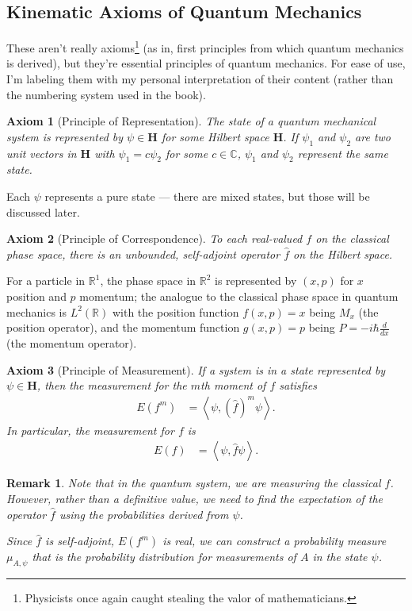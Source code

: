 \documentclass[10pt]{extarticle}
\newtheorem*{remark}{Remark}
\newcommand{\R}{\mathbb{R}}
\newcommand{\C}{\mathbb{C}}
\newcommand{\iprod}[2]{\left\langle #1,#2\right\rangle}
\theoremstyle{plain}
\newtheorem*{axiom}{Axiom}%
\theoremstyle{definition}
\theoremstyle{remark}
\renewcommand{\newline}{\hfill\break}
\begin{document}
  \subsection{Kinematic Axioms of Quantum Mechanics}%
  These aren't really axioms\footnote{Physicists once again caught stealing the valor of mathematicians.} (as in, first principles from which quantum mechanics is derived), but they're essential principles of quantum mechanics. For ease of use, I'm labeling them with my personal interpretation of their content (rather than the numbering system used in the book).
  \begin{axiom}[Principle of Representation]
    The state of a quantum mechanical system is represented by $\psi \in \mathbf{H}$ for some Hilbert space $\mathbf{H}$. If $\psi_1$ and $\psi_2$ are two unit vectors in $\mathbf{H}$ with $\psi_1 = c\psi_2$ for some $c\in \C$, $\psi_1$ and $\psi_2$ represent the same state.
  \end{axiom}
  Each $\psi$ represents a pure state --- there are mixed states, but those will be discussed later.
  \begin{axiom}[Principle of Correspondence]
    To each real-valued $f$ on the classical phase space, there is an unbounded, self-adjoint operator $\hat{f}$ on the Hilbert space.
  \end{axiom}
  For a particle in $\R^{1}$, the phase space in $\R^{2}$ is represented by $(x,p)$ for $x$ position and $p$ momentum; the analogue to the classical phase space in quantum mechanics is $L^{2}(\R)$ with the position function $f(x,p) = x$ being $M_x$ (the position operator), and the momentum function $g(x,p) = p$ being $P = -i\hbar\frac{d}{dx}$ (the momentum operator).
  \begin{axiom}[Principle of Measurement]
    If a system is in a state represented by $\psi \in \mathbf{H}$, then the measurement for the $m$th moment of $f$ satisfies
    \begin{align*}
      E(f^{m}) &= \iprod{\psi}{\left(\hat{f}\right)^m\psi}.
    \end{align*}
    In particular, the measurement for $f$ is
    \begin{align*}
      E(f) &= \iprod{\psi}{\hat{f}\psi}.
    \end{align*}
  \end{axiom}
  \begin{remark}
    Note that in the quantum system, we are measuring the \textit{classical} $f$. However, rather than a definitive value, we need to find the expectation of the operator $\hat{f}$ using the probabilities derived from $\psi$.\newline

    Since $\hat{f}$ is self-adjoint, $E(f^{m})$ is real, we can construct a probability measure $\mu_{A,\psi}$ that is the probability distribution for measurements of $A$ in the state $\psi$.
  \end{remark}
\end{document}
